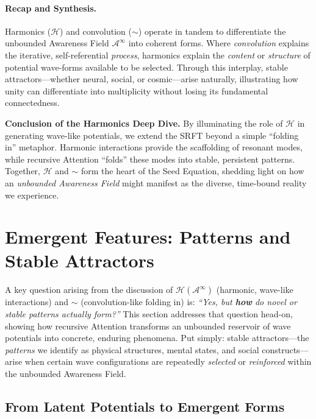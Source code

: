 \documentclass[12pt,a4paper]{article}
\begin{document}
\paragraph{Recap and Synthesis.}
Harmonics (\(\mathcal{H}\)) and convolution (\(\sim\)) operate in tandem to differentiate
the unbounded Awareness Field \(\mathscr{A}^\infty\) into coherent forms. Where
\emph{convolution} explains the iterative, self-referential \emph{process}, harmonics
explain the \emph{content} or \emph{structure} of potential wave-forms available to be
selected. Through this interplay, stable attractors---whether neural, social, or cosmic---arise
naturally, illustrating how unity can differentiate into multiplicity without losing its
fundamental connectedness.

\medskip
\noindent
\textbf{Conclusion of the Harmonics Deep Dive.} 
By illuminating the role of \(\mathcal{H}\) in generating wave-like potentials, we extend
the SRFT beyond a simple “folding in” metaphor. Harmonic interactions provide the scaffolding
of resonant modes, while recursive Attention “folds” these modes into stable, persistent
patterns. Together, \(\mathcal{H}\) and \(\sim\) form the heart of the Seed Equation,
shedding light on how an \emph{unbounded Awareness Field} might manifest as the diverse,
time-bound reality we experience.

\section{Emergent Features: Patterns and Stable Attractors}
\label{sec:emergent-features}

A key question arising from the discussion of \(\mathcal{H}(\mathscr{A}^\infty)\) (harmonic,
wave-like interactions) and \(\sim\) (convolution-like folding in) is:
\emph{``Yes, but \textbf{how} do novel or stable patterns actually form?''}
This section addresses that question head-on, showing how recursive Attention
transforms an unbounded reservoir of wave potentials into concrete, enduring
phenomena. Put simply: stable attractors---the \emph{patterns} we identify as
physical structures, mental states, and social constructs---arise when certain
wave configurations are repeatedly \emph{selected} or \emph{reinforced} within
the unbounded Awareness Field.

\subsection{From Latent Potentials to Emergent Forms}
\label{subsec:latent-to-emergent}
\end{document}
